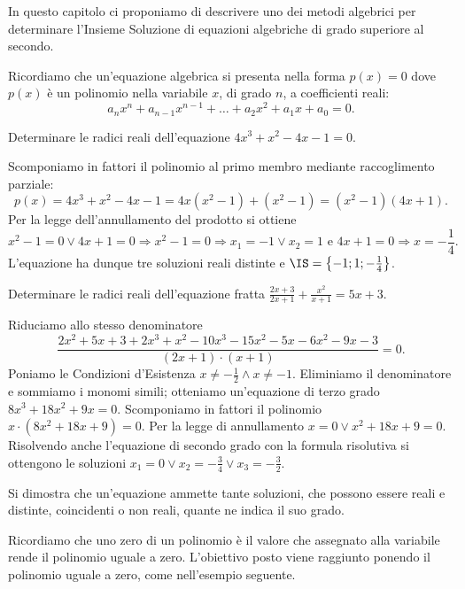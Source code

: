 In questo capitolo ci proponiamo di descrivere uno dei metodi algebrici per 
determinare l'Insieme Soluzione di equazioni algebriche di grado superiore 
al secondo.

Ricordiamo che un'equazione algebrica si presenta nella forma \(p(x)=0\) dove 
\(p(x)\) è un polinomio nella variabile \(x\), di grado \(n\), a coefficienti reali: 
\[a_nx^n+a_{n-1}x^{n-1}+ \ldots +a_2x^2+a_1x+a_0=0.\]

\begin{esempio}
Determinare le radici reali dell'equazione \(4x^3+x^2-4x-1=0\).

Scomponiamo in fattori il polinomio al primo membro mediante raccoglimento 
parziale: 
\[p(x)=4x^3+x^2-4x-1=4x 
\left(x^2-1\right)+\left(x^2-1\right)=\left(x^2-1\right) 
(4x+1).\] 
Per la legge dell'annullamento del prodotto si ottiene 
\[x^2-1=0\vee 4x+1=0 \Rightarrow x^2-1=0\Rightarrow x_1=-1\vee x_2=1\text{ e 
}4x+1=0\Rightarrow x=-\frac{1}{4}.\] L'equazione ha dunque tre soluzioni reali 
distinte e \(\IS=\left\{-1;1;-\frac 1 4\right\}\).
\end{esempio}
\begin{esempio}
Determinare le radici reali dell'equazione fratta 
\(\frac{2x+3}{2x+1}+\frac{x^2}{x+1}=5x+3\).

Riduciamo allo stesso denominatore 
\[\frac{2x^2+5x+3+2x^3+x^2-10x^3-15x^2-5x-6x^2-9x-3}{(2x+1)\cdot (x+1)}=0.\]
Poniamo le Condizioni d'Esistenza \(x\neq -\frac 1 2\wedge x\neq -1\). Eliminiamo 
il denominatore e sommiamo i monomi simili; otteniamo un'equazione di terzo 
grado \(8x^3+18x^2+9x=0\). Scomponiamo in fattori il polinomio \(x\cdot 
\left(8x^2+18x+9\right)=0\). Per la legge di annullamento \(x=0\vee x^2+18x+9=0\). 
Risolvendo anche l'equazione di secondo grado con la formula risolutiva si 
ottengono le soluzioni \(x_1=0\vee x_2=-\frac 3 4\vee x_3=-\frac 3 2\).

\osservazione
Si dimostra che un'equazione ammette tante soluzioni, che possono essere reali 
e 
distinte, coincidenti o non reali, quante ne indica il suo grado.

Ricordiamo che uno zero di un polinomio è il valore che assegnato alla 
variabile 
rende il polinomio uguale a zero. L'obiettivo posto viene raggiunto ponendo il 
polinomio uguale a zero, come nell'esempio seguente.
\end{esempio}

